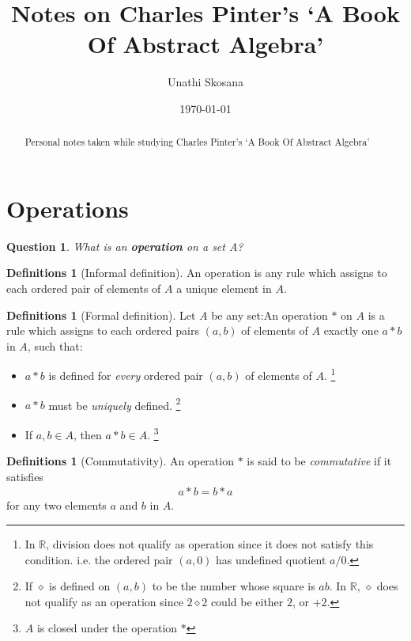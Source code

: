 \documentclass[nohyper,nobib]{tufte-handout}
\title{Notes on Charles Pinter's `A Book Of Abstract Algebra'} %
\author{Unathi Skosana}
\date{\vspace{-5pt}\normalsize \today} %
\newtheorem{quest}[thm]{Question}
\theoremstyle{definition}
\newtheorem{defns}[thm]{Definitions}
\theoremstyle{remark}
\begin{document}
\justifying 
\maketitle

\begin{abstract}
\noindent
Personal notes taken while studying Charles Pinter's `A Book Of Abstract Algebra'
\end{abstract}

\tableofcontents

\section{Operations}

\begin{quest}
	What is an \textbf{operation} on a set A?
\end{quest}

\begin{defns}[Informal definition]
    An operation is any rule which assigns to each ordered pair of elements of $A$ a unique element in $A$.
\end{defns}

\begin{defns}[Formal definition]
	Let $A$ be any set:\newline An operation $*$ on $A$ is a rule which assigns to each ordered pairs $(a,b)$ of elements of $A$ exactly one $a * b$ in $A$, such that:
    \begin{itemize}
        \item $a * b$ is defined for \emph{every} ordered pair $(a,b)$ of elements of $A$. \footnote{In $\mathbb{R}$, division does not qualify as operation since it does not satisfy this condition. i.e. the ordered pair $(a, 0)$ has undefined quotient $a / 0$.}
        \item $a * b$ must be \emph{uniquely} defined. \footnote{If $\diamond$ is defined on $(a, b)$ to be the number whose square is $ab$. In $\mathbb{R}$, $\diamond$ does not qualify as an operation since $2 \diamond 2$  could be either $2$, or $+2$.}
        \item If $a, b \in A$, then $a * b \in A$. \footnote{$A$ is closed under the operation $*$}
    \end{itemize}
\end{defns}

    
\begin{defns}[Commutativity]
    An operation $*$ is said to be \emph{commutative} if it satisfies
    \begin{align}
        a * b  = b * a
    \end{align}
    for any two elements $a$ and $b$ in $A$.
\end{defns}
\end{document}
